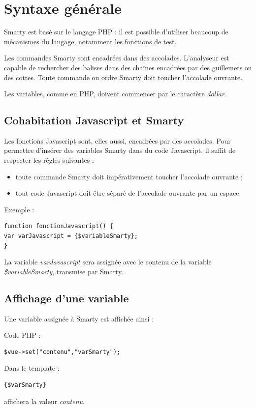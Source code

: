 \section{Syntaxe générale}
Smarty est basé sur le langage PHP : il est possible d'utiliser beaucoup de mécanismes du langage, notamment les fonctions de test.

Les commandes Smarty sont encadrées dans des accolades. L'analyseur est capable de rechercher des balises dans des chaînes encadrées par des guillemets ou des cottes. Toute commande ou ordre Smarty doit toucher l'accolade ouvrante.

Les variables, comme en PHP, doivent commencer par le caractère \textit{dollar}.

\subsection{Cohabitation Javascript et Smarty}

Les fonctions Javascript sont, elles aussi, encadrées par des accolades. Pour permettre d'insérer des variables Smarty dans du code Javascript, il suffit de respecter les règles suivantes :
\begin{itemize}
\item toute commande Smarty doit impérativement toucher l'accolade ouvrante ;
\item tout code Javascript doit être séparé de l'accolade ouvrante par un espace.
\end{itemize}

Exemple :
\begin{lstlisting}
function fonctionJavascript() {
var varJavascript = {$variableSmarty};
}
\end{lstlisting}

La variable \textit{varJavascript} sera assignée avec le contenu de la variable \textit{\$variableSmarty}, transmise par Smarty.

\subsection{Affichage d'une variable}

Une variable assignée à Smarty est affichée ainsi :

Code PHP :
\begin{lstlisting}
$vue->set("contenu","varSmarty");
\end{lstlisting}

Dans le template :
\begin{lstlisting}
{$varSmarty}
\end{lstlisting}
affichera la valeur \textit{contenu}.


